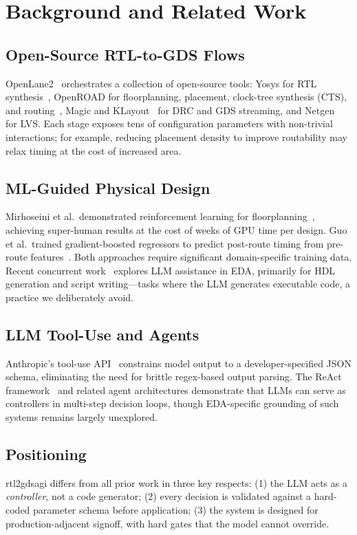 \documentclass[conference]{IEEEtran}
\begin{document}
\section{Background and Related Work}

\subsection{Open-Source RTL-to-GDS Flows}
OpenLane2~\cite{shalan2020openlane} orchestrates a collection of
open-source tools: Yosys for RTL synthesis~\cite{wolf2013yosys},
OpenROAD for floorplanning, placement, clock-tree synthesis (CTS),
and routing~\cite{kahng2021openroad}, Magic and
KLayout~\cite{klayout} for DRC and GDS streaming, and
Netgen~\cite{netgen} for LVS.
Each stage exposes tens of configuration parameters with non-trivial
interactions; for example, reducing placement density to improve
routability may relax timing at the cost of increased area.

\subsection{ML-Guided Physical Design}
Mirhoseini et al.\ demonstrated reinforcement learning for
floorplanning~\cite{mirhoseini2021chip}, achieving super-human results
at the cost of weeks of GPU time per design.
Guo et al.\ trained gradient-boosted regressors to predict
post-route timing from pre-route features~\cite{guo2022machine}.
Both approaches require significant domain-specific training data.
Recent concurrent work~\cite{liu2023chipnemo, he2023chateda} explores
LLM assistance in EDA, primarily for HDL generation and
script writing—tasks where the LLM generates executable
code, a practice we deliberately avoid.

\subsection{LLM Tool-Use and Agents}
Anthropic's tool-use API~\cite{anthropic2024tools} constrains model
output to a developer-specified JSON schema, eliminating the need for
brittle regex-based output parsing.
The ReAct framework~\cite{yao2022react} and related agent
architectures demonstrate that LLMs can serve as controllers in
multi-step decision loops, though EDA-specific grounding
of such systems remains largely unexplored.

\subsection{Positioning}
rtl2gdsagi differs from all prior work in three key respects:
(1) the LLM acts as a \emph{controller}, not a code generator;
(2) every decision is validated against a hard-coded parameter schema
    before application;
(3) the system is designed for production-adjacent signoff, with hard
    gates that the model cannot override.
\end{document}
